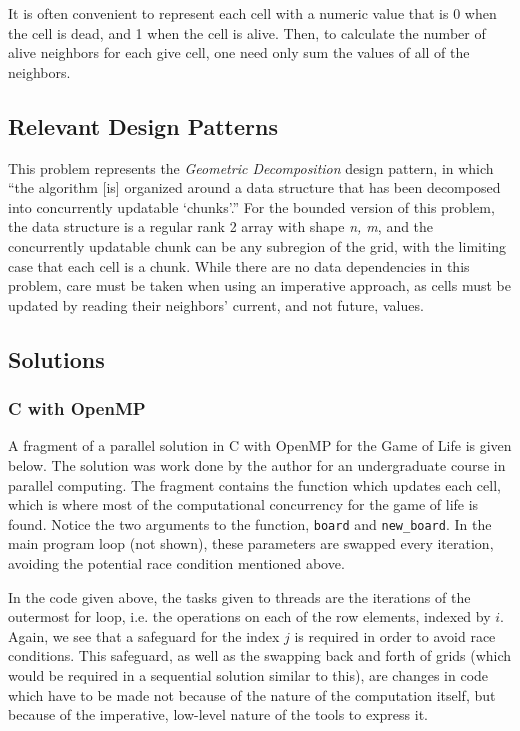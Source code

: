 It is often convenient to represent each cell with a numeric value 
that is 0 when the cell is dead, and 1 when the cell is alive. 
Then, to calculate the number of alive neighbors for each give cell, 
one need only sum the values of all of the neighbors.

\subsection{Relevant Design Patterns}
This problem represents the \textit{Geometric Decomposition} design pattern,\cite{mass}
in which ``the algorithm [is] organized around a data structure that has been decomposed into concurrently updatable `chunks'.''
For the bounded version of this problem, 
the data structure is a regular rank 2 array with shape \textit{n, m}, 
and the concurrently updatable chunk can be any subregion of the grid, 
with the limiting case that each cell is a chunk. 
While there are no data dependencies in this problem, 
care must be taken when using an imperative approach, 
as cells must be updated by reading their neighbors' current, and not future, values.

\subsection{Solutions}
\subsubsection{C with OpenMP}
A fragment of a parallel solution in C with OpenMP for the Game of Life is given below. 
The solution was work done by the author for an undergraduate course in parallel computing.
The fragment contains the function which updates each cell, 
which is where most of the computational concurrency for the game of life is found. 
Notice the two arguments to the function, \texttt{board} and \texttt{new\_board}.
In the main program loop (not shown), these parameters are swapped every iteration, 
avoiding the potential race condition mentioned above.

\begin{singlespacing}
\begin{small}

\end{small}
\end{singlespacing}

In the code given above, the tasks given to threads are the iterations of the outermost for loop, 
i.e. the operations on each of the row elements, indexed by $i$.
Again, we see that a safeguard for the index $j$ is required in order to avoid race conditions. 
This safeguard, as well as the swapping back and forth of grids (which would be required in a sequential solution similar to this), 
are changes in code which have to be made not because of the nature of the computation itself, 
but because of the imperative, low-level nature of the tools to express it.

